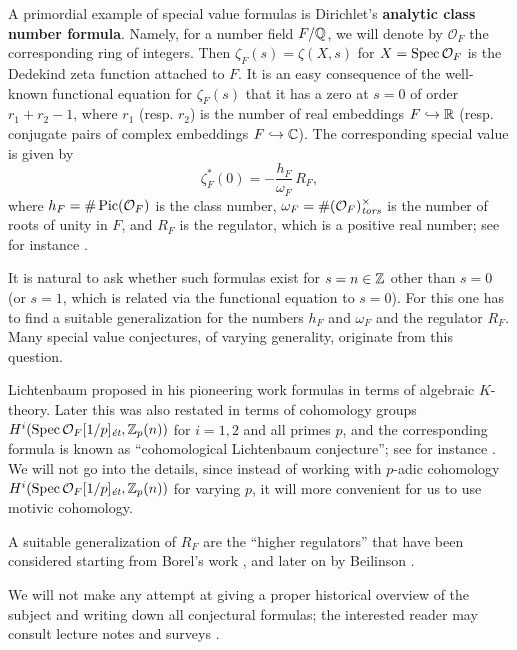 \documentclass{article}
\numberwithin{equation}{section}
\begin{document}
A primordial example of special value formulas is Dirichlet's
\textbf{analytic class number formula}. Namely, for a number field $F/\QQ$, we
will denote by $\mathcal{O}_F$ the corresponding ring of integers. Then
$\zeta_F (s) = \zeta (X,s)$ for $X = \Spec \mathcal{O}_F$ is the Dedekind zeta
function attached to $F$.  It is an easy consequence of the well-known
functional equation for $\zeta_F (s)$ that it has a zero at $s = 0$ of order
$r_1 + r_2 - 1$, where $r_1$ (resp. $r_2$) is the number of real embeddings
$F \hookrightarrow \RR$ (resp. conjugate pairs of complex embeddings
$F \hookrightarrow \CC$). The corresponding special value is given by
\begin{equation}
  \label{eqn:zeta-F-at-s=0}
  \zeta^*_F (0) = -\frac{h_F}{\omega_F}\,R_F,
\end{equation}
where $h_F = \# \Pic (\mathcal{O}_F)$ is the class number,
$\omega_F = \# (\mathcal{O}_F)^\times_\tors$ is the number of roots of unity in
$F$, and $R_F$ is the regulator, which is a positive real number;
see for instance \cite[\S VII.5]{Neukirch-1999}.

It is natural to ask whether such formulas exist for $s = n \in \ZZ$ other than
$s = 0$ (or $s = 1$, which is related via the functional equation to $s = 0$).
For this one has to find a suitable generalization for the
numbers $h_F$ and $\omega_F$ and the regulator $R_F$. Many special value
conjectures, of varying generality, originate from this question.

Lichtenbaum proposed in his pioneering work \cite{Lichtenbaum-1973} formulas in
terms of algebraic $K$-theory. Later this was also restated in terms of
cohomology groups $H^i (\Spec \mathcal{O}_F [1/p]_\et, \ZZ_p (n))$
for $i = 1,2$ and all primes $p$, and the corresponding formula is known as
``cohomological Lichtenbaum conjecture''; see for instance
\cite{Huber-Kings-2003}. We will not go into the details, since instead of
working with $p$-adic cohomology
$H^i (\Spec \mathcal{O}_F [1/p]_\et, \ZZ_p (n))$ for varying $p$, it will more
convenient for us to use motivic cohomology.

A suitable generalization of $R_F$ are the ``higher regulators'' that have been
considered starting from Borel's work \cite{Borel-1977}, and later on by
Beilinson \cite{Beilinson-1984}.

We will not make any attempt at giving a proper historical overview of the
subject and writing down all conjectural formulas; the interested reader may
consult lecture notes \cite{Kolster-2004} and surveys
\cite{Goncharov-2005,Kahn-2005}.
\end{document}
